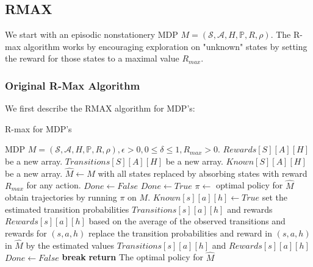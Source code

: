 \documentclass[12pt, letterpaper]{article}
\theoremstyle{definition}
\theoremstyle{remark}
\begin{document}
\subsection{RMAX}

We start with an episodic nonstationery MDP \(M = (\mathcal{S}, \mathcal{A}, H, \mathbb{P}, R, \rho)\). The R-max algorithm works by encouraging exploration on "unknown" states by setting the reward for those states to a maximal value \(R_{max}\).

\subsubsection{Original R-Max Algorithm}

We first describe the RMAX algorithm for MDP's:

\begin{algorithm}[H]
\caption{R-max for MDP's}
\label{alg:rmax}
\begin{algorithmic}[1]
    \Require MDP \(M = (\mathcal{S}, \mathcal{A}, H, \mathbb{P}, R, \rho), \epsilon > 0, 0 \leq\delta \leq 1, R_{max} > 0\).
        \State $Rewards[S][A][H]$ be a new array.
        \State $Transitions[S][A][H]$ be a new array.
        \State $Known[S][A][H]$ be a new array.
        \State $\hat{M} \gets M$ with all states replaced by absorbing states with reward \(R_{max}\) for any action.
        \State \(Done \gets False\)
            \State \(Done \gets True\)
            \State \(\pi \gets \) optimal policy for \(\hat{M}\)
                \State obtain trajectories by running \(\pi\) on \(M\).
                    \State \(Known[s][a][h] \gets True\)
                    \State set the estimated transition probabilities \(Transitions[s][a][h]\) and rewards \(Rewards[s][a][h]\) based on the average of the observed transitions and rewards for \((s, a, h)\)
                    \State replace the transition probabilities and reward in \((s, a, h)\) in \(\hat{M}\) by the estimated values \(Transitions[s][a][h]\) and \(Rewards[s][a][h]\)
                    \State \(Done \gets False\)
                    \State \textbf{break}
                \EndIf
            \EndWhile
        \EndWhile
        \State \textbf{return} The optimal policy for \(\hat{M}\)

    \EndProcedure
    
\end{algorithmic}
\end{algorithm}
\end{document}
